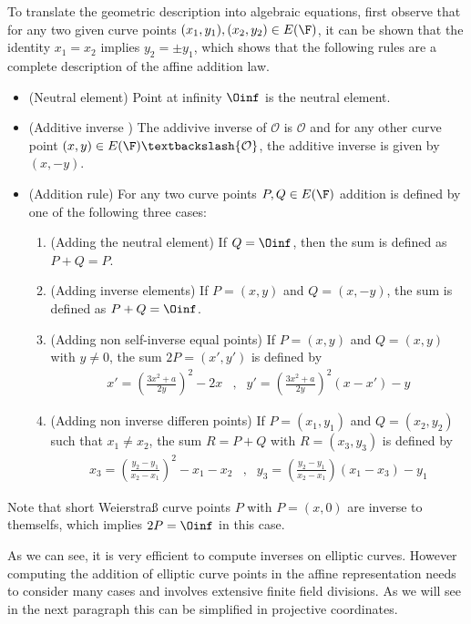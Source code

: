 To translate the geometric description into algebraic equations, first observe that for any two given curve points $(x_1,y_1), (x_2,y_2)\in E(\F)$, it can be shown that the identity $x_1=x_2$ implies $y_2=\pm y_1$, which shows that the following rules are a complete description of the affine addition law.
\begin{itemize}
\item (Neutral element) Point at infinity $\Oinf$ is the neutral element.
\item (Additive inverse ) The addivive inverse of $\mathcal{O}$ is $\mathcal{O}$ and for any other curve point $(x,y) \in E(\F)\textbackslash \{\mathcal{O}\}$, the additive inverse is given by $(x,-y)$.
\item (Addition rule) For any two curve points $P, Q \in E(\F)$ addition is defined by one of the following three cases:
\begin{enumerate}
\item (Adding the neutral element) If $Q=\Oinf$, then the sum is defined as $P+Q=P$.
\item (Adding inverse elements)  If $P=(x,y)$ and $Q=(x,-y)$, the sum is defined as $P+Q=\Oinf$.
\item (Adding non self-inverse equal points) If $P=(x,y)$ and $Q=(x,y)$ with $y\neq 0$, the sum $2P=(x',y')$ is defined by
$$
\begin{array}{llr}
x' = \left(\frac{3x^2+a}{2y}\right)^2 -2x &,&
y' = \left(\frac{3x^2+a}{2y}\right)^2\left(x-x'\right) - y
\end{array} 
$$
\item (Adding non inverse differen points) If $P=(x_1,y_1)$ and $Q=(x_2,y_2)$ such that $x_1 \neq x_2$, the sum $R=P+Q$ with $R=(x_3,y_3)$ is defined by
$$
\begin{array}{llr}
x_3 = \left(\frac{y_2-y_1}{x_2-x_1}\right)^2 -x_1-x_2 &, &
y_3 = \left(\frac{y_2-y_1}{x_2-x_1} \right)\left(x_1-x_3\right) - y_1
\end{array} 
$$
\end{enumerate}
 
\end{itemize} 
Note that short Weierstraß curve points $P$ with $P=(x,0)$ are inverse to themselfs, which implies $2P=\Oinf$ in this case.

As we can see, it is very efficient to compute inverses on elliptic curves. However computing the addition of elliptic curve points in the affine representation needs to consider many cases and involves extensive finite field divisions. As we will see in the next paragraph this can be simplified in projective coordinates.

